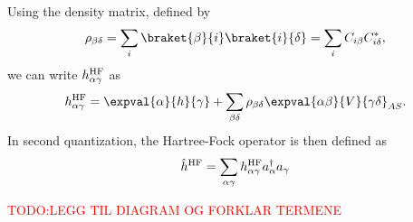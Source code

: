 Using the density matrix, defined by
\begin{equation*}
    \rho_{\beta\delta} = \sum_{i} \braket{\beta}{i} \braket{i}{\delta} = \sum_{i} C_{i\beta} C_{i\delta}^*,
\end{equation*}
we can write $h_{\alpha \gamma}^{\mathrm{HF}}$ as
\begin{equation*}
    h_{\alpha \gamma}^\HF = \expval{\alpha}{h}{\gamma} + \sum_{\beta\delta} \rho_{\beta\delta} \expval{\alpha\beta}{V}{\gamma\delta}_{AS}.
\end{equation*}
In second quantization, the Hartree-Fock operator is then defined as
\begin{equation*}
    \hat{h}^{\mathrm{HF}} = \sum_{\alpha\gamma} h_{\alpha\gamma}^{\mathrm{HF}} a_\alpha^\dagger a_\gamma
\end{equation*}

\textcolor{red}{TODO:\@ LEGG TIL DIAGRAM OG FORKLAR TERMENE}
